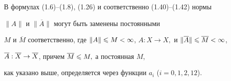 \begin{note}


В формулах (1.6)--(1.8), (1.26) и соответственно (1.40)--(1.42) нормы


$\|A\|$ и $\| \overline{A}\|$ могут быть заменены постоянными


$M$ и $\overline{M}$ соответственно, где $\|A\|\lea


M< \infty$, $A:X\to X,$ и $\|\overline{A}\|\lea \overline{M}<\infty$,


$\overline{A}:\overline{X}\to \overline{X}$, причем $\overline{M}\leqslant M,$ а постоянная $M$,


как указано выше, определяется через функции $a_i$ ($i=0,1,2,12$).


\end{note}






